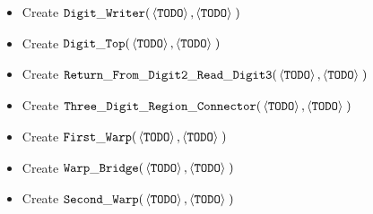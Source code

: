 \begin{itemize}
        \item Create
        $\begin{aligned}[t]
            {\tt Digit\_Writer}(&\left\langle {\tt TODO} \right\rangle,
                      \left\langle {\tt TODO} \right\rangle \;)
        \end{aligned}$

        \item Create
        $\begin{aligned}[t]
            {\tt Digit\_Top}(&\left\langle {\tt TODO} \right\rangle,
                   \left\langle {\tt TODO} \right\rangle \;)
        \end{aligned}$

        \item Create
        $\begin{aligned}[t]
            {\tt Return\_From\_Digit2\_Read\_Digit3} (&\left\langle {\tt TODO} \right\rangle,
                                        \left\langle {\tt TODO} \right\rangle \;)
        \end{aligned}$

        \item Create
        $\begin{aligned}[t]
            {\tt Three\_Digit\_Region\_Connector} (&\left\langle {\tt TODO} \right\rangle,
                                                    \left\langle {\tt TODO} \right\rangle \;)
        \end{aligned}$

        \item Create
        $\begin{aligned}[t]
            {\tt First\_Warp}(&\left\langle {\tt TODO} \right\rangle,
                        \left\langle {\tt TODO} \right\rangle \;)
        \end{aligned}$

        \item Create
        $\begin{aligned}[t]
            {\tt Warp\_Bridge}(&\left\langle {\tt TODO} \right\rangle,
                         \left\langle {\tt TODO} \right\rangle \;)
        \end{aligned}$

        \item Create
        $\begin{aligned}[t]
            {\tt Second\_Warp}(&\left\langle {\tt TODO} \right\rangle,
                         \left\langle {\tt TODO} \right\rangle \;)
        \end{aligned}$


\end{itemize}
